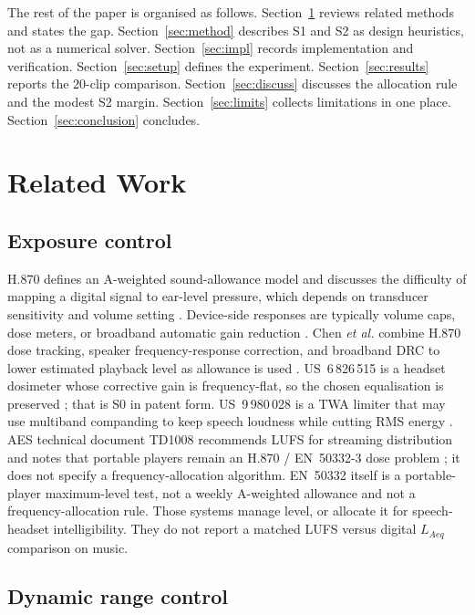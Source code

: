 \documentclass[12pt,journal,onecolumn]{IEEEtran}
\begin{document}
The rest of the paper is organised as follows. Section~\ref{sec:related} reviews related methods and states the gap. Section~\ref{sec:method} describes S1 and S2 as design heuristics, not as a numerical solver. Section~\ref{sec:impl} records implementation and verification. Section~\ref{sec:setup} defines the experiment. Section~\ref{sec:results} reports the 20-clip comparison. Section~\ref{sec:discuss} discusses the allocation rule and the modest S2 margin. Section~\ref{sec:limits} collects limitations in one place. Section~\ref{sec:conclusion} concludes.

\section{Related Work}
\label{sec:related}

\subsection{Exposure control}

H.870 defines an A-weighted sound-allowance model and discusses the difficulty of mapping a digital signal to ear-level pressure, which depends on transducer sensitivity and volume setting \cite{H870}. Device-side responses are typically volume caps, dose meters, or broadband automatic gain reduction \cite{Levey2011,Sulaiman2013,Chen2023}. Chen \emph{et al.} combine H.870 dose tracking, speaker frequency-response correction, and broadband DRC to lower estimated playback level as allowance is used \cite{Chen2023}. US~6\,826\,515 is a headset dosimeter whose corrective gain is frequency-flat, so the chosen equalisation is preserved \cite{US6826515}; that is S0 in patent form. US~9\,980\,028 is a TWA limiter that may use multiband companding to keep speech loudness while cutting RMS energy \cite{US9980028}. AES technical document TD1008 recommends LUFS for streaming distribution and notes that portable players remain an H.870 / EN~50332-3 dose problem \cite{AESTD1008}; it does not specify a frequency-allocation algorithm. EN~50332 itself is a portable-player maximum-level test, not a weekly A-weighted allowance and not a frequency-allocation rule. Those systems manage level, or allocate it for speech-headset intelligibility. They do not report a matched LUFS versus digital $L_{Aeq}$ comparison on music.

\subsection{Dynamic range control}
\end{document}
